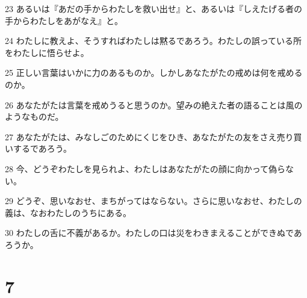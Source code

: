 \par 23 あるいは『あだの手からわたしを救い出せ』と、あるいは『しえたげる者の手からわたしをあがなえ』と。
\par 24 わたしに教えよ、そうすればわたしは黙るであろう。わたしの誤っている所をわたしに悟らせよ。
\par 25 正しい言葉はいかに力のあるものか。しかしあなたがたの戒めは何を戒めるのか。
\par 26 あなたがたは言葉を戒めうると思うのか。望みの絶えた者の語ることは風のようなものだ。
\par 27 あなたがたは、みなしごのためにくじをひき、あなたがたの友をさえ売り買いするであろう。
\par 28 今、どうぞわたしを見られよ、わたしはあなたがたの顔に向かって偽らない。
\par 29 どうぞ、思いなおせ、まちがってはならない。さらに思いなおせ、わたしの義は、なおわたしのうちにある。
\par 30 わたしの舌に不義があるか。わたしの口は災をわきまえることができぬであろうか。

\chapter{7}

